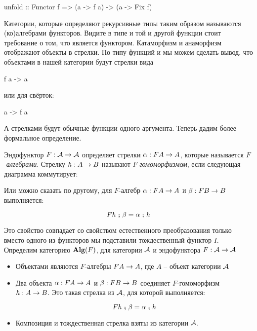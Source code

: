 \begin{code}
unfold :: Functor f => (a -> f a) -> (a -> Fix f)
\end{code}

Категории, которые определяют рекурсивные типы таким образом
называются (ко)алгебрами функторов. Видите в типе и той и другой
функции стоит требование о том, что  является функтором.
Катаморфизм и анаморфизм отображают объекты в стрелки.
По типу функций  и  мы можем сделать вывод,
что объектами в нашей категории будут стрелки вида 

\begin{code}
f a -> a
\end{code}

или для свёрток:

\begin{code}
a -> f a
\end{code}

А стрелками будут обычные функции одного аргумента. 
Теперь дадим более формальное определение. 

Эндофунктор $F : \mathcal{A} \rightarrow \mathcal{A}$ определяет
стрелки  $\alpha : FA \rightarrow A$, которые называется $F$-\emph{алгебрами}. 
Стрелку $h : A \rightarrow B$ называют \mbox{$F$-\emph{гомоморфизмом}}, 
если следующая диаграмма коммутирует: 


Или можно сказать по другому, для $F$-алгебр $\alpha:FA \rightarrow A$ 
и $\beta : FB \rightarrow B$ выполняется:

\[ Fh \footnotesize\textbf{~;~}\normalsize \beta = \alpha \footnotesize\textbf{~;~}\normalsize h   \]

Это свойство совпадает со свойством естественного 
преобразования только вместо одного из функторов мы подставили 
тождественный функтор $I$. 
Определим категорию $\textbf{Alg}(F)$, для категории $\mathcal{A}$ и 
эндофунктора $F : \mathcal{A} \rightarrow \mathcal{A}$

\begin{itemize}
\item Объектами являются $F$-алгебры $FA \rightarrow A$, где $A$ -- объект
    категории $\mathcal{A}$

\item Два объекта $\alpha : FA \rightarrow A$ и $\beta : FB \rightarrow B$ 
    соединяет $F$-гомоморфизм
    \mbox{$h : A \rightarrow B$}. Это такая стрелка из $\mathcal{A}$, для 
    которой выполняется:

\[ Fh \footnotesize\textbf{~;~}\normalsize \beta = \alpha \footnotesize\textbf{~;~}\normalsize h   \]

\item Композиция и тождественная стрелка взяты из категории $\mathcal{A}$.
\end{itemize}

